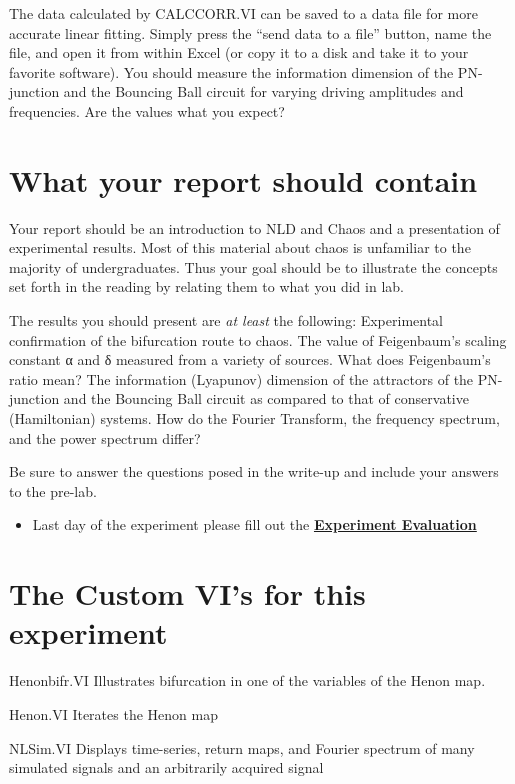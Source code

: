 \documentclass{../lab}
\begin{document}
The data calculated by CALCCORR.VI can be saved to a data file for more accurate linear fitting. Simply press the ``send data to a file'' button, name the file, and open it from within Excel (or copy it to a disk and take it to your favorite software). You should measure the information dimension of the PN-junction and the Bouncing Ball circuit for varying driving amplitudes and frequencies. Are the values what you expect?

\section{What your report should contain}

Your report should be an introduction to NLD and Chaos and a presentation of experimental results. Most of this material about chaos is unfamiliar to the majority of undergraduates. Thus your goal should be to illustrate the concepts set forth in the reading by relating them to what you did in lab.

The results you should present are \emph{at least} the following: Experimental confirmation of the bifurcation route to chaos. The value of Feigenbaum's scaling constant α and δ measured from a variety of sources. What does Feigenbaum's ratio mean? The information (Lyapunov) dimension of the attractors of the PN-junction and the Bouncing Ball circuit as compared to that of conservative (Hamiltonian) systems. How do the Fourier Transform, the frequency spectrum, and the power spectrum differ?

Be sure to answer the questions posed in the write-up and include your answers to the pre-lab.

\begin{itemize}
    \item Last day of the experiment please fill out the \href{\ExperimentEvaluation}{\textbf{Experiment Evaluation}}

\end{itemize}

\section{The Custom VI's for this experiment}

Henonbifr.VI Illustrates bifurcation in one of the variables of the Henon map.

Henon.VI Iterates the Henon map

NLSim.VI Displays time-series, return maps, and Fourier spectrum of many simulated signals and an arbitrarily acquired signal
\end{document}
